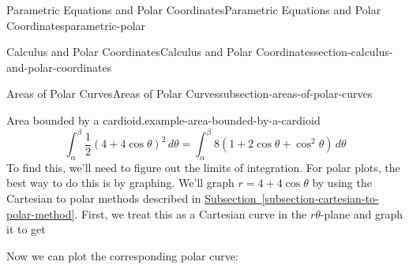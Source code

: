 \documentclass[oneside,10pt,]{book}
\numberwithin{equation}{section}
\begin{document}
\begin{chapterptx}{Parametric Equations and Polar Coordinates}{}{Parametric Equations and Polar Coordinates}{}{}{parametric-polar}
\begin{sectionptx}{Calculus and Polar Coordinates}{}{Calculus and Polar Coordinates}{}{}{section-calculus-and-polar-coordinates}
\begin{subsectionptx}{Areas of Polar Curves}{}{Areas of Polar Curves}{}{}{subsection-areas-of-polar-curves}
\begin{example}{Area bounded by a cardioid.}{example-area-bounded-by-a-cardioid}
%
\begin{equation*}
\int_{\alpha}^{\beta}\frac{1}{2}(4+4\cos\theta)^{2}\,d\theta = \int_{\alpha}^{\beta}8(1+2\cos\theta+\cos^{2}\theta)\,d\theta
\end{equation*}
\hypertarget{p-1049}{}%
To find this, we'll need to figure out the limits of integration. For polar plots, the best way to do this is by graphing. We'll graph \(r=4+4\cos\theta\) by using the Cartesian to polar methods described in \hyperref[subsection-cartesian-to-polar-method]{Subsection~\ref{subsection-cartesian-to-polar-method}}. First, we treat this as a Cartesian curve in the \(r\theta\)-plane and graph it to get%
\begin{figure}
\centering
{
}
\end{figure}
\hypertarget{p-1050}{}%
Now we can plot the corresponding polar curve:%
\begin{figure}
\centering
{
}
\end{figure}
\end{example}
\end{subsectionptx}
\end{sectionptx}
\end{chapterptx}
\end{document}
